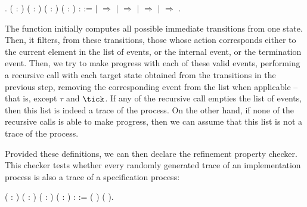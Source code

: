 \begin{coqdoccode}
	\coqdocindent{1.00em}
	.\coqdoceol
	\coqdocemptyline
	\coqdocnoindent
	 \coqdoceol
	\coqdocindent{1.00em}
	( : )\coqdoceol
	\coqdocindent{1.00em}
	( : )\coqdoceol
	\coqdocindent{1.00em}
	( : )\coqdoceol
	\coqdocindent{1.00em}
	( :  ) :  :=\coqdoceol
	\coqdocindent{1.00em}
	  \coqdoceol
	\coqdocindent{1.00em}
	\ensuremath{|}  \ensuremath{\Rightarrow} \coqdoceol
	\coqdocindent{1.00em}
	\ensuremath{|}   \ensuremath{\Rightarrow}\coqdoceol
	\coqdocindent{2.00em}
	      \coqdoceol
	\coqdocindent{2.00em}
	\ensuremath{|}  \ensuremath{\Rightarrow} \coqdoceol
	\coqdocindent{2.00em}
	\ensuremath{|}   \ensuremath{\Rightarrow} \coqdoceol
	\coqdocindent{2.00em}
	\coqdoceol
	\coqdocindent{1.00em}
	.\coqdoceol
\end{coqdoccode}


The function  initially computes all possible immediate transitions from one state. Then, it filters, from these transitions, those whose action corresponds either to the current element in the list of events, or the internal event, or the termination event. Then, we try to make progress with each of these valid events, performing a recursive call with each target state obtained from the transitions in the previous step, removing the corresponding event from the list when applicable -- that is, except $ \tau $ and $ \tick $. If any of the recursive call empties the list of events, then this list is indeed a trace of the process. On the other hand, if none of the recursive calls is able to make progress, then we can assume that this list is not a trace of the process.

Provided these definitions, we can then declare the refinement property checker. This checker tests whether every randomly generated trace of an implementation process is also a trace of a specification process:

\begin{coqdoccode}
	\coqdocnoindent
	 \coqdoceol
	\coqdocindent{1.00em}
	( : )\coqdoceol
	\coqdocindent{1.00em}
	(  : )\coqdoceol
	\coqdocindent{1.00em}
	( : )\coqdoceol
	\coqdocindent{1.00em}
	( : ) :  :=\coqdoceol
	\coqdocindent{2.00em}
	 (   ) (   ).\coqdoceol
\end{coqdoccode}

